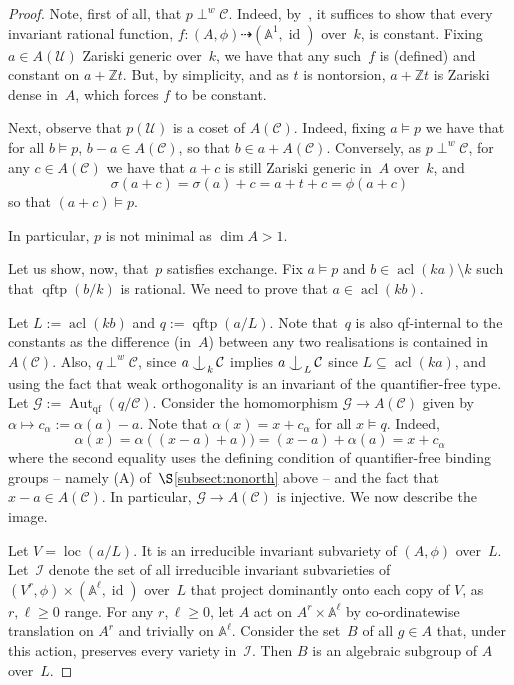 \documentclass[\DocOpts]{amsart}
\theoremstyle{definition}
\def\qftp{\operatorname{qftp}}
\def\qf{\operatorname{qf}}
\def\acl{\operatorname{acl}}
\def\aut{\operatorname{Aut}}
\def\loc{\operatorname{loc}}
\def\C{\mathcal{C}}
\def\G{\mathcal{G}}
\def\U{\mathcal{U}}
\def\I{\mathcal{I}}
\def\ZZ{\mathbb{Z}}
\renewcommand{\AA}{\mathbb{A}}
\providecommand{\id}{\operatorname{id}}
\newcommand{\<}{\langle}
\renewcommand{\>}{\rangle}
\newcommand{\dto}{\dashrightarrow}
\def\Ind#1#2{#1\setbox0=\hbox{\(#1x\)}\kern\wd0\hbox to 
0pt{\hss\(#1\mid\)\hss}\lower.9\ht0\hbox to 
0pt{\hss\(#1\smile\)\hss}\kern\wd0}
\def\ind{\mathop{\mathpalette\Ind{}}}
\begin{document}
\begin{proof}
Note, first of all, that $p\perp^w\C$.
Indeed, by~\cite[Proposition~2.7]{qfint}, it suffices to show that every invariant rational function, $f:(A,\phi)\dto(\AA^1,\id)$ over~$k$, is constant.
Fixing $a\in A(\U)$ Zariski generic over~$k$, we have that any such~$f$ is (defined) and constant on $a+\ZZ t$.
But, by simplicity, and as $t$ is nontorsion, $a+\mathbb Zt$ is Zariski dense in~$A$, which forces $f$ to be constant.

Next, observe that $p(\U)$ is a coset of $A(\C)$.
Indeed, fixing $a\models p$ we have that for all $b\models p$, $b-a\in A(\C)$, so that $b\in a+A(\C)$.
Conversely, as $p\perp^w\C$, for any $c\in A(\C)$ we have that $a+c$ is still Zariski generic in~$A$ over~$k$, and
$$\sigma(a+c)=\sigma(a)+c=a+t+c=\phi(a+c)$$
so that $(a+c)\models p$.

In particular, $p$ is not minimal as $\dim A>1$.

Let us show, now, that~$p$ satisfies exchange.
Fix $a\models p$ and $b\in\acl(ka)\setminus k$ such that $\qftp(b/k)$ is rational.
We need to prove that $a\in\acl(kb)$.

Let $L:=\acl(kb)$ and $q:=\qftp(a/L)$.
Note that~$q$ is also qf-internal to the constants as the difference (in~$A$) between any two realisations is contained in $A(\C)$.
Also, $q\perp^w\C$, since $a\ind_k\C$ implies $a\ind_L\C$ since $L\subseteq\acl(ka)$, and using the fact that weak orthogonality is an invariant of the quantifier-free type.
Let $\G:=\aut_{\qf}(q/\C)$.
Consider the homomorphism $\G\to A(\C)$ given by $\alpha\mapsto c_\alpha:=\alpha(a)-a$.
Note that $\alpha(x)=x+c_\alpha$ for all $x\models q$.
Indeed,
$$\alpha(x)=\alpha((x-a)+a))=(x-a)+\alpha(a)=x+c_\alpha$$
where the second equality uses the defining condition of quantifier-free binding groups -- namely (A) of~$\S$\ref{subsect:nonorth} above -- and the fact that $x-a\in A(\C)$.
In particular, $\G\to A(\C)$ is injective.
We now describe the image.

Let $V=\loc(a/L)$.
It is an irreducible invariant subvariety of $(A,\phi)$ over~$L$.
Let~$\I$ denote the set of all irreducible invariant subvarieties of $(V^r,\phi)\times(\AA^\ell,\id)$ over~$L$ that project dominantly onto each copy of $V$, as $r,\ell\geq 0$ range.
For any $r,\ell\geq 0$, let $A$ act on $A^r\times\AA^\ell$ by co-ordinatewise translation on $A^r$ and trivially on $\AA^\ell$.
Consider the set~$B$ of all $g\in A$ that, under this action, preserves every variety in~$\I$.
Then $B$ is an algebraic subgroup of $A$ over~$L$.


\end{proof}
\end{document}
